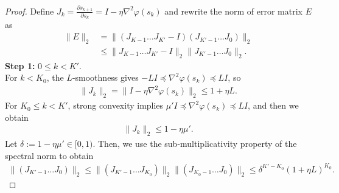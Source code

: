 \documentclass[10pt,a4paper]{amsart}
\begin{document}
\begin{proof}
    Define $J_k = \frac{\partial s_{k+1}}{\partial s_k} = I - \eta \nabla^2 \varphi(s_k)$ and rewrite the norm of error matrix $E$ as 
    \begin{align}\label{eq: trunc E}
        \| E\|_2 &= \|(J_{K-1} \dots J_{K'} - I)(J_{K'-1} \dots J_0) \|_2 \nonumber\\
        &\leq \| J_{K-1} \dots J_{K'} - I \|_2 \| J_{K'-1} \dots J_0\|_2.
    \end{align}
    \textbf{Step 1:} $0 \leq k < K'$. \\
    For $k < K_0$, the $L$-smoothness gives $-L I \preceq \nabla^2 \varphi(s_k) \preceq LI$, so 
    \begin{align*}
        \| J_k \|_2 = \| I - \eta \nabla^2 \varphi(s_k) \|_2 \leq 1 + \eta L.
    \end{align*}
    For $K_0 \leq k <K'$, strong convexity implies $\mu' I \preceq \nabla^2 \varphi (s_k) \preceq L I$, and then we obtain 
    \begin{align*}
       \| J_k \|_2 \leq 1 - \eta \mu'.
    \end{align*}
    Let $\delta := 1 - \eta \mu' \in [0, 1)$.
    Then, we use the sub-multiplicativity property of the spectral norm to obtain
    \begin{align}\label{eq: trunc B1}
        \| (J_{K'-1} \dots J_0)\|_2 \leq \| (J_{K'-1} \dots J_{K_0})\|_2 \| (J_{K_0-1} \dots J_0)\|_2 \leq \delta^{K' - K_0} (1 +\eta L)^{K_0}.
    \end{align}
    

\end{proof}
\end{document}
